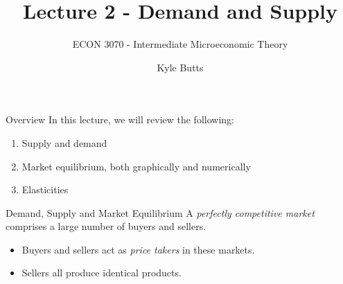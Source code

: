 \documentclass[12pt,t]{beamer}
\author{Kyle Butts}
\title{Lecture 2 - Demand and Supply}
\subtitle{ECON 3070 - Intermediate Microeconomic Theory}
\begin{document}
\begin{frame}
  \titlepage
\end{frame}

\begin{frame}{Overview}
  In this lecture, we will review the following:
  \begin{enumerate}
    \item Supply and demand

    \item Market equilibrium, both graphically and numerically

    \item Elasticities
  \end{enumerate}
\end{frame}

\begin{frame}{Demand, Supply and Market Equilibrium}
  A \textit{perfectly competitive market} comprises a large number of buyers and sellers.
  \begin{itemize}
    \item Buyers and sellers act as \textit{price takers} in these markets.
    \item Sellers all produce identical products.
  \end{itemize}
\end{frame}
\end{document}
